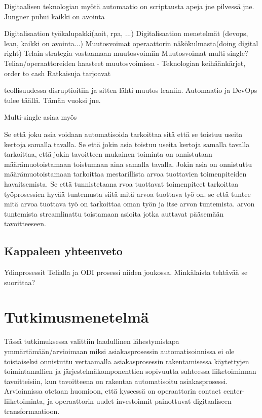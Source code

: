 \documentclass[finnish,12pt,a4paper,pdftex]{article}
\begin{document}
Digitaalisen teknologian myötä automaatio on scriptausta apeja jne pilvessä jne. Jungner puhui kaikki on avointa



Digitalisaation työkalupakki(aoit, rpa, ...)
Digitalisaation menetelmät (devops, lean, kaikki on avointa...)
Muutosvoimat operaattorin näkökulmasta(doing digital right)
Telain strategia vastaamaan muutosvoimiin
Muutosvoimat
multi single?
Telian/operaattoreiden haasteet muutosvoimissa
- Teknologian keihäänkärjet, order to cash
Ratkaisuja tarjoavat 

teollisuudessa disruptioitiin ja sitten lähti muutos leaniin.
Automaatio ja DevOps tulee täällä. Tämän vuoksi jne.

Multi-single asiaa myös


Se että joku asia voidaan automatisoida tarkoittaa sitä että se toistuu useita kertoja samalla tavalla. Se että jokin asia toistuu useita kertoja samalla tavalla tarkoittaa, että jokin tavoitteen mukainen toiminta on onnistutaan määrämuotoistamaan toistumaan aina samalla tavalla. Jokin asia on onnistuttu määrämuotoistamaan tarkoittaa mestarillista arvoa tuottavien toimenpiteiden havaitsemista. Se
 että tunnistetaana rvoa tuottavat toimenpiteet tarkoittaa työprosessien hyvää tuntemusta siitä mitä arvoa tuottava työ on. se että tuntee mitä arvoa tuottava työ on tarkoittaa oman työn ja itse arvon tuntemista.
arvon tuntemista
streamlinattu toistamaan asioita jotka auttavat pääsemään tavoitteeseen. 


\subsection{Kappaleen yhteenveto}


Ydinprosessit Telialla ja ODI prosessi niiden joukossa. Minkälaista tehtävää se suorittaa?



\clearpage

\section{Tutkimusmenetelmä}

Tässä tutkimuksessa valittiin laadullinen lähestymistapa ymmärtämään/arvioimaan miksi asiakasprosessin automatisoinnissa ei ole toistaiseksi onnistuttu vertaamalla asiakasprosessin rakentamisessa käytettyjen toimintamallien ja järjestelmäkomponenttien sopivuutta suhteessa liiketoiminnan tavoitteisiin, kun tavoitteena on rakentaa automatisoitu asiakasprosessi. Arvioinnissa otetaan huomioon, että kyseessä on operaattorin contact center-liiketoiminta, ja operaattorin uudet investoinnit painottuvat digitaaliseen transformaatioon. 
\end{document}

